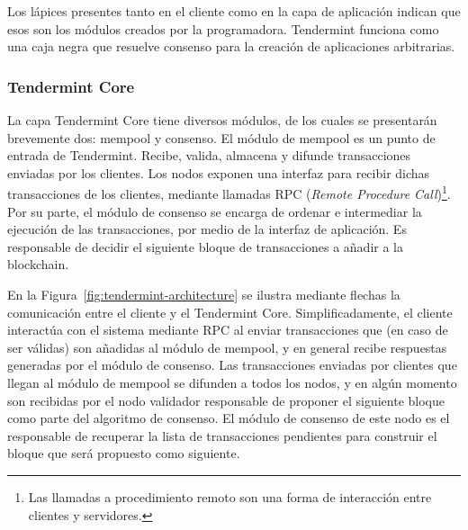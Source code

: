 Los lápices presentes tanto en el cliente como en la capa de aplicación indican que esos son los módulos creados
por la programadora.
%
Tendermint funciona como una caja negra que resuelve consenso para la creación de aplicaciones arbitrarias.
%

\subsubsection{Tendermint Core}

La capa Tendermint Core tiene diversos módulos, de los cuales se presentarán brevemente dos: mempool y consenso.
%
El módulo de mempool es un punto de entrada de Tendermint.
%
Recibe, valida, almacena y difunde transacciones enviadas por los clientes. 
%
%
Los nodos exponen una interfaz para recibir dichas transacciones de los clientes, mediante llamadas
RPC (\textit{Remote Procedure Call})\footnote{Las llamadas a procedimiento remoto son una forma de
interacción entre clientes y servidores.}.
%
%
%
Por su parte, el módulo de consenso se encarga de ordenar e intermediar la ejecución de las transacciones, por medio de la
interfaz de aplicación. Es responsable de decidir el siguiente bloque de transacciones a añadir a la blockchain.

En la Figura~\ref{fig:tendermint-architecture} se ilustra mediante flechas la comunicación
entre el cliente y el Tendermint Core.
Simplificadamente, el cliente interactúa con el sistema mediante RPC al enviar transacciones
que (en caso de ser válidas) son añadidas al módulo de mempool,
y en general recibe respuestas generadas por el módulo de consenso.
Las transacciones enviadas por clientes que llegan al módulo de mempool se difunden a todos los nodos,
y en algún momento son recibidas
por el nodo validador responsable de proponer el siguiente bloque como parte del algoritmo de consenso.
El módulo de consenso de este nodo es el responsable de recuperar la lista de transacciones pendientes
para construir el bloque que será propuesto como siguiente. 


